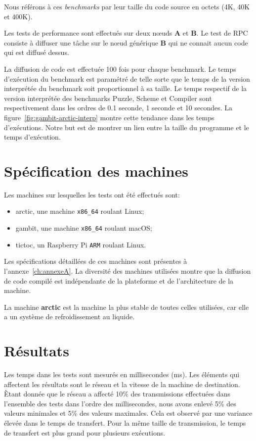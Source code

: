 Nous référons à ces \textit{benchmarks} par leur taille du code source
en octets (4K, 40K et 400K).

Les tests de performance sont effectués sur deux nœuds \textbf{A}
et \textbf{B}. Le test de RPC consiste à diffuser une tâche
sur le nœud générique \textbf{B} qui ne connait aucun
code qui est diffusé dessus.

La diffusion de code est effectuée 100 fois pour chaque benchmark. Le temps
d'exécution du benchmark est paramétré de telle sorte que le temps de la version
interprétée du benchmark soit proportionnel à sa taille. Le temps respectif de
la version interprétée des benchmarks Puzzle, Scheme et Compiler sont
respectivement dans les ordres de 0.1 seconde, 1 seconde et 10 secondes. La
figure~\ref{fig:gambit-arctic-interp} montre cette tendance dans les temps
d'exécutions. Notre but est de montrer un lien entre la taille du
programme et le temps d'exécution.

\section{Spécification des machines}
Les machines sur lesquelles les tests ont été effectués sont:
\begin{itemize}
  \item arctic, une machine \texttt{x86\_64} roulant Linux;
  \item gambit, une machine \texttt{x86\_64} roulant macOS;
  \item tictoc, un Raspberry Pi \texttt{ARM} roulant Linux.
\end{itemize}

Les spécifications détaillées de ces machines sont présentes à
l'annexe~\ref{ch:annexeA}. La diversité des machines utilisées montre que la
diffusion de code compilé est indépendante de la plateforme et de l'architecture de la
machine.

La machine \textbf{arctic} est la machine la plus stable de toutes
celles utilisées, car elle a un système de refroidissement au liquide.

\section{Résultats}

Les temps dans les tests sont mesurés en millisecondes (ms).  Les éléments qui
affectent les résultats sont le réseau et la vitesse de la machine de
destination. Ètant donnée que le réseau a affecté 10\% des transmissions
effectuées dans l'ensemble des tests dans l'ordre des millisecondes, nous avons
enlevé 5\% des valeurs minimales et 5\% des valeurs maximales.  Cela est
observé par une variance élevée dans le temps de transfert.  Pour la même
taille de transmission, le temps de transfert est plus grand pour plusieurs
exécutions.

